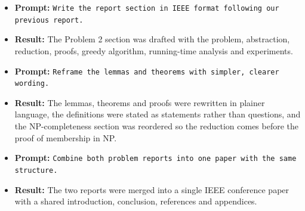 \documentclass[conference]{IEEEtran}
\theoremstyle{definition}
\theoremstyle{remark}
\begin{document}
\begin{itemize}
    \item \textbf{Prompt:} \texttt{Write the report section in IEEE format following our previous report.}
    \item \textbf{Result:} The Problem 2 section was drafted with the problem, abstraction, reduction, proofs, greedy algorithm, running-time analysis and experiments.

    \item \textbf{Prompt:} \texttt{Reframe the lemmas and theorems with simpler, clearer wording.}
    \item \textbf{Result:} The lemmas, theorems and proofs were rewritten in plainer language, the definitions were stated as statements rather than questions, and the NP-completeness section was reordered so the reduction comes before the proof of membership in NP.

    \item \textbf{Prompt:} \texttt{Combine both problem reports into one paper with the same structure.}
    \item \textbf{Result:} The two reports were merged into a single IEEE conference paper with a shared introduction, conclusion, references and appendices.
\end{itemize}
\end{document}
